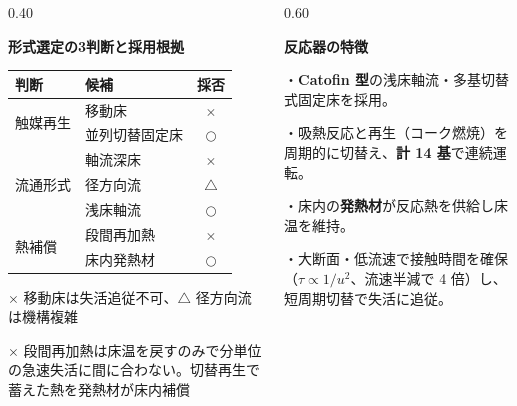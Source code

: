 \begin{frame}[t]
\begin{columns}[T,onlytextwidth]
\begin{column}{0.40\textwidth}
      \vspace{1.0em}
      \raggedright
      {\small\bfseries 形式選定の3判断と採用根拠}\par
      \vspace{0.4em}
      {\scriptsize\renewcommand{\arraystretch}{1.15}%
       \begin{tabular}{@{}l l c@{}}
         \toprule
         判断 & 候補 & 採否 \\
         \midrule
         \multirow{2}{*}{触媒再生}
            & 移動床            & $\times$ \\
            & {\color{SpRed}並列切替固定床} & $\bigcirc$ \\
         \midrule
         \multirow{3}{*}{流通形式}
            & 軸流深床   & $\times$ \\
            & 径方向流   & $\triangle$ \\
            & {\color{SpRed}浅床軸流}   & $\bigcirc$ \\
         \midrule
         \multirow{2}{*}{熱補償}
            & 段間再加熱 & $\times$ \\
            & {\color{SpRed}床内発熱材}   & $\bigcirc$ \\
         \bottomrule
       \end{tabular}}\par
      \vspace{0.25em}
      {\tiny\raggedright $\times$ 移動床は失活追従不可、$\triangle$ 径方向流は機構複雑\par
       \vspace{0.18em}
       $\times$ 段間再加熱は床温を戻すのみで分単位の急速失活に間に合わない。切替再生で蓄えた熱を発熱材が床内補償\par}
    \end{column}

    \begin{column}{0.60\textwidth}
      \hspace*{9mm}\begin{minipage}{\dimexpr\linewidth-9mm\relax}
        \raggedright
        {\bfseries 反応器の特徴}\par
        \vspace{0.3em}
        {\scriptsize\raggedright\linespread{1.18}\selectfont
          ・\textbf{Catofin 型}の浅床軸流・多基切替式固定床を採用。\par
          ・吸熱反応と再生（コーク燃焼）を周期的に切替え、\textbf{計 14 基}で連続運転。\par
          ・床内の\textbf{発熱材}が反応熱を供給し床温を維持。\par
          ・大断面・低流速で接触時間を確保（$\tau\propto 1/u^{2}$、流速半減で 4 倍）し、短周期切替で失活に追従。\par
        }
      \end{minipage}\par


\end{column}
\end{columns}
\end{frame}
